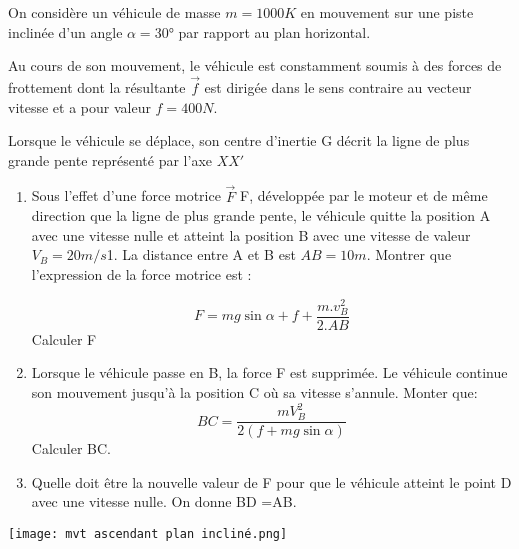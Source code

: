\documentclass[10pt,a4paper]{article}
\begin{document}
\begin{tcolorbox}[sabour,title=EXERCICE 18]

On considère un véhicule de masse $m = 1000K $ en mouvement sur une piste inclinée d'un angle $\alpha = $30° par rapport au plan horizontal.

 Au cours de son mouvement, le véhicule est constamment soumis à des forces de frottement dont la résultante $\vec{f} $ est dirigée dans le sens contraire au vecteur vitesse et a pour valeur $f =400N$.
 
Lorsque le véhicule se déplace, son centre d'inertie G décrit la ligne de plus grande pente représenté par l'axe $XX'$ 

\begin{enumerate}


\item  Sous l'effet d'une force motrice $\vec{F}$ F, développée par le moteur et de même direction que la ligne de plus grande pente, le véhicule quitte la position A avec une vitesse nulle et atteint la position B avec une vitesse de valeur $V_B=20m/s$1. La distance entre A et B est  $AB = 10m$. Montrer que l'expression de la force motrice est :

$$  F= mg\sin \alpha +f +\dfrac{m.v_B^2}{2.AB}$$
Calculer F
\item  Lorsque le véhicule passe en B, la force F est supprimée. Le véhicule continue son mouvement jusqu'à la position C où sa vitesse s'annule. Monter que: 
$$ BC = \dfrac{mV_B^2}{2(f+mg\sin \alpha)}$$
Calculer BC.
\item Quelle doit être la nouvelle valeur de F pour que le véhicule atteint le point D avec une vitesse nulle.
On donne BD =AB.

\end{enumerate}

\begin{center}

\texttt{[image: mvt ascendant plan incliné.png]} 

\end{center}


\end{tcolorbox}
\end{document}
